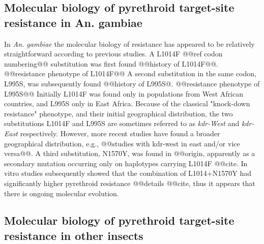 \documentclass[a4paper,11pt,abstracton,hidelinks]{scrartcl}
\begin{document}
\subsection*{Molecular biology of pyrethroid target-site resistance in An. gambiae}


%
In \textit{An. gambiae} the molecular biology of resistance has appeared to be relatively straightforward according to previous studies.
%
A L1014F @@ref codon numbering@@ substitution was first found @@history of L1014F@@.
%
@@resistance phenotype of L1014F@@
%
A second substitution in the same codon, L995S, was subsequently found @@history of L995S@.
%
@@resistance phenotype of L995S@@
%
Initially L1014F was found only in populations from West African countries, and L995S only in East Africa.
%
Because of the classical "knock-down resistance" phenotype, and their initial geographical distribution, the two substitutions L1014F and L995S are sometimes referred to as \textit{kdr-West} and \textit{kdr-East} respectively.
%
However, more recent studies have found a broader geographical distribution, e.g., @@studies with kdr-west in east and/or vice versa@@.
%
A third substitution, N1570Y, was found in @@origin, apparently as a secondary mutation occurring only on haplotypes carrying L1014F @@cite.
%
In vitro studies subsequently showed that the combination of L1014+N1570Y had significantly higher pyrethroid resistance @@details @@cite, thus it appears that there is ongoing molecular evolution.


\subsection*{Molecular biology of pyrethroid target-site resistance in other insects}
\end{document}
